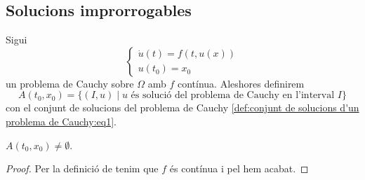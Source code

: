 \documentclass[../Apunts.tex]{subfiles}
\begin{document}
	\subsection{Solucions improrrogables}
	\begin{definition}
		\label{def:conjunt de solucions d'un problema de Cauchy}
		Sigui
		\begin{equation}
			\label{def:conjunt de solucions d'un problema de Cauchy:eq1}
			\begin{cases}
				\displaystyle \dot{u}(t)=f(t,u(x)) \\
				\displaystyle u(t_{0})=x_{0}
			\end{cases}
		\end{equation}
		un problema de Cauchy sobre \(\Omega\) amb \(f\) contínua. Aleshores definirem
		\[A(t_{0},x_{0})=\{(I,u)\mid u\text{ és solució del problema de Cauchy en l'interval }I\}\]
		con el conjunt de solucions del problema de Cauchy \eqref{def:conjunt de solucions d'un problema de Cauchy:eq1}.
	\end{definition}
	\begin{observation}
		\label{obs:el conjunt de solucions d'un problema de Cauchy amb f contínua és no buit}
		\(A(t_{0},x_{0})\neq\emptyset\).
		\begin{proof}
			Per la definició de  tenim que \(f\) és contínua i pel  hem acabat.
		\end{proof}
	\end{observation}
\end{document}
